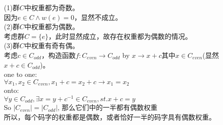 \documentclass[a4paper, justified]{tufte-handout}
\begin{document}
\begin{solution}
  (1)群$C$中权重都为奇数。\\
  因为$e\in C\land w(e)=0$，显然不成立。\\
  (2)群$C$中权重都为偶数。\\
  考虑群$C=\{e\}$，此时显然成立，故存在权重都为偶数的情况。\\
  (3)群$C$中权重有奇有偶。\\
  考虑$c\in C_{odd}$，构造函数$f:C_{even}\to C_{odd}$ by $x\to x+c$其中$x\in C_{even}$(显然$x+c\in C_{odd}$)。\\
  one to one:\\
  $\forall x_1, x_2\in C_{even}, x_1+ c = x_2 + c \to x_1 = x_2$\\
  onto:\\
  $\forall y\in C_{odd}, \exists x = y + c^{-1}\in C_{even}, st.x + c = y$\\
  So $|C_{even}|=|C_{odd}|$, 那么它们中的一半都有偶数权重\\

  \noindent 所以，每个码字的权重都是偶数，或者恰好一半的码字具有偶数权重。
\end{solution}

\begin{problem}[TJ 8-21]
\end{problem}
\end{document}
